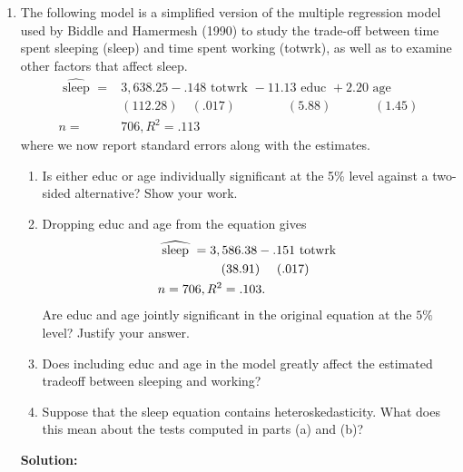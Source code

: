 \documentclass[12pt]{article}
\begin{document}
\begin{enumerate}
{\begin{enumerate}
    \item If the variance of price changes with assess, lotsize, sqrft, or bdrms, the assumption of homoskedasticity is violated. This could lead to invalid inference using the F-test in part (c) because the test assumes homoskedastic errors. Specifically, the standard errors might be biased, leading to incorrect p-values and conclusions.

\end{enumerate}
}



\item The following model is a simplified version of the multiple regression model used by Biddle and Hamermesh (1990) to study the trade-off between time spent sleeping (sleep) and time spent working (totwrk), as well as to examine other factors that affect sleep.
$$
\begin{aligned}
\widehat{\text { sleep }}= & 3,638.25-.148 \text { totwrk }-11.13 \text { educ }+2.20 \text { age } \\
& (112.28)\quad(.017)\quad\quad\quad\quad(5.88)\quad\quad\quad\,\,(1.45) \\
n= & 706, R^2=.113
\end{aligned}
$$
where we now report standard errors along with the estimates.
\begin{enumerate}
    \item Is either educ or age individually significant at the 5\% level against a two-sided alternative? Show your work.
\item Dropping educ and age from the equation gives
$$
\begin{aligned}
& \widehat{\text { sleep }}=3,586.38-.151 \text { totwrk } \\
& \text {\quad \quad\quad \quad\quad(38.91) \quad(.017) } \\
& n=706, R^2=.103 \text {. }
\end{aligned}
$$
Are educ and age jointly significant in the original equation at the $5 \%$ level? Justify your answer.
 \item Does including educ and age in the model greatly affect the estimated tradeoff between sleeping and working?
 \item Suppose that the sleep equation contains heteroskedasticity. What does this mean about the tests computed in parts (a) and (b)?
\end{enumerate}


{\color{blue}
\noindent \textbf{Solution:}

}
\end{enumerate}
\end{document}
